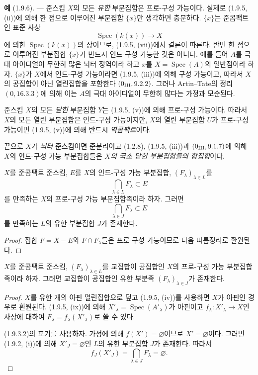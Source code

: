 \begin{env}[1.9.6]
\label{IV.1.9.6-fr}
\textbf{예} (1.9.6). --- 준스킴 $X$의 모든 \emph{유한} 부분집합은
프로-구성 가능이다. 실제로 (1.9.5, (ii))에 의해 한 점으로 이루어진
부분집합 $\{x\}$만 생각하면 충분하다. $\{x\}$는 준콤팩트인 표준 사상
\[
  \operatorname{Spec}(k(x))\longrightarrow X
\]
에 의한 $\operatorname{Spec}(k(x))$의 상이므로, (1.9.5, (vii))에서
결론이 따른다. 반면 한 점으로 이루어진 부분집합 $\{x\}$가 반드시
인드-구성 가능한 것은 아니다. 예를 들어 $A$를 극대 아이디얼이
무한히 많은 뇌터 정역이라 하고 $x$를
$X=\operatorname{Spec}(A)$의 일반점이라 하자. $\{x\}$가 $X$에서
인드-구성 가능이라면 (1.9.5, (iii))에 의해 구성 가능이고, 따라서
$X$의 공집합이 아닌 열린집합을 포함한다
$(0\textsubscript{III}, 9.2.2)$. 그러나 Artin--Tate의 정리
$(0, 16.3.3)$에 의해 이는 $A$의 극대 아이디얼이 무한히 많다는
가정과 모순된다.

준스킴 $X$의 모든 \emph{닫힌} 부분집합 $Y$는 (1.9.5, (v))에 의해
프로-구성 가능이다. 따라서 $X$의 모든 열린 부분집합은 인드-구성
가능이지만, $X$의 열린 부분집합 $U$가 프로-구성 가능이면
(1.9.5, (v))에 의해 반드시 \emph{역콤팩트}이다.

끝으로 $X$가 \emph{뇌터} 준스킴이면 준분리이고 (1.2.8),
(1.9.5, (iii))과 $(0\textsubscript{III}, 9.1.7)$에 의해 $X$의
인드-구성 가능 부분집합들은 \emph{$X$의 국소 닫힌 부분집합들의
합집합}이다.
\end{env}

\begin{theorem}[1.9.7]
\label{IV.1.9.7-fr}
$X$를 준콤팩트 준스킴, $E$를 $X$의 인드-구성 가능 부분집합,
$(F_\lambda)_{\lambda\in L}$를
\[
  \bigcap_{\lambda\in L}F_\lambda\subset E
\]
를 만족하는 $X$의 프로-구성 가능 부분집합족이라 하자. 그러면
\[
  \bigcap_{\lambda\in J}F_\lambda\subset E
\]
를 만족하는 $L$의 유한 부분집합 $J$가 존재한다.
\end{theorem}

\begin{proof}
집합 $F=X-E$와 $F\cap F_\lambda$들은 프로-구성 가능이므로 다음
따름정리로 환원된다.
\end{proof}

\begin{corollary}[1.9.8]
\label{IV.1.9.8-fr}
$X$를 준콤팩트 준스킴,
$(F_\lambda)_{\lambda\in L}$를 교집합이 공집합인 $X$의 프로-구성
가능 부분집합족이라 하자. 그러면 교집합이 공집합인 유한 부분족
$(F_\lambda)_{\lambda\in J}$가 존재한다.
\end{corollary}

\begin{proof}
$X$를 유한 개의 아핀 열린집합으로 덮고 (1.9.5, (iv))를 사용하면
$X$가 아핀인 경우로 환원된다. (1.9.5, (ix))에 의해
$X'_\lambda=\operatorname{Spec}(A'_\lambda)$가 아핀이고
$f_\lambda:X'_\lambda\to X$인 사상에 대하여
$F_\lambda=f_\lambda(X'_\lambda)$로 쓸 수 있다.


(1.9.3.2)의 표기를 사용하자. 가정에 의해 $f(X')=\varnothing$이므로
$X'=\varnothing$이다. 그러면 (1.9.2, (i))에 의해 $X'_J=\varnothing$인
$L$의 유한 부분집합 $J$가 존재한다. 따라서
\[
  f_J(X'_J)=\bigcap_{\lambda\in J}F_\lambda=\varnothing.
\]
\end{proof}

